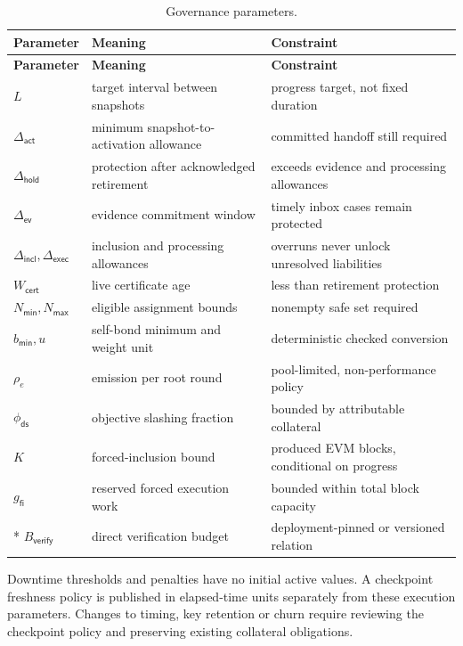\begin{longtable}{p{3.2cm}p{6.4cm}p{3.6cm}}
\caption{Governance parameters.}\label{ta:gov-params}\\
\textbf{Parameter} & \textbf{Meaning} & \textbf{Constraint}\\ \hline
\endfirsthead
\textbf{Parameter} & \textbf{Meaning} & \textbf{Constraint}\\ \hline
\endhead
$L$ & target interval between snapshots & progress target, not fixed duration\\
$\Delta_\mathsf{act}$ & minimum snapshot-to-activation allowance & committed handoff still required\\
$\Delta_\mathsf{hold}$ & protection after acknowledged retirement & exceeds evidence and processing allowances\\
$\Delta_\mathsf{ev}$ & evidence commitment window & timely inbox cases remain protected\\
$\Delta_\mathsf{incl},\Delta_\mathsf{exec}$ & inclusion and processing allowances & overruns never unlock unresolved liabilities\\
$W_\mathsf{cert}$ & live certificate age & less than retirement protection\\
$N_\mathsf{min},N_\mathsf{max}$ & eligible assignment bounds & nonempty safe set required\\
$b_\mathsf{min},u$ & self-bond minimum and weight unit & deterministic checked conversion\\
$\rho_e$ & emission per root round & pool-limited, non-performance policy\\
$\phi_\mathsf{ds}$ & objective slashing fraction & bounded by attributable collateral\\
$K$ & forced-inclusion bound & produced EVM blocks, conditional on progress\\
$g_\mathsf{fi}$ & reserved forced execution work & bounded within total block capacity\\*
$B_\mathsf{verify}$ & direct verification budget & deployment-pinned or versioned relation\\
\end{longtable}

Downtime thresholds and penalties have no initial active values. A checkpoint freshness policy is published in elapsed-time units separately from these execution parameters. Changes to timing, key retention or churn require reviewing the checkpoint policy and preserving existing collateral obligations.
